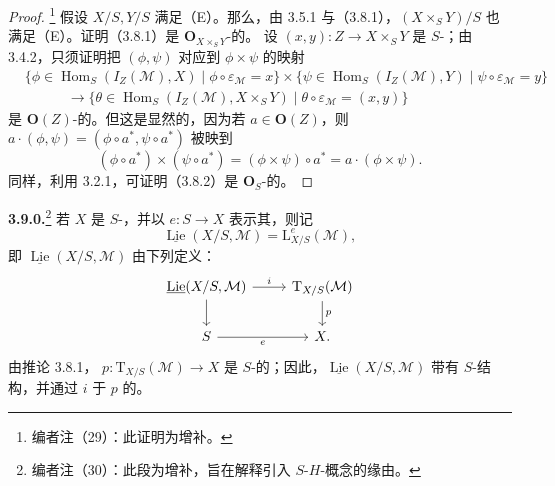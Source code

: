 \begin{proof}
\footnote{编者注（29）：此证明为增补。} 假设 $X/S,Y/S$ 满足（E）。那么，由 3.5.1 与（3.8.1），$(X\times_S Y)/S$ 也满足（E）。证明（3.8.1）是 $\mathbf O_{X\times_S Y}$-的。
设 $(x,y):Z\to X\times_S Y$ 是 $S$-；由 3.4.2，只须证明把 $(\phi,\psi)$ 对应到 $\phi\times\psi$ 的映射
\[
\begin{aligned}
{}&\{\phi\in\operatorname{Hom}_S(I_Z(\mathcal M),X)\mid\phi\circ\varepsilon_{\mathcal M}=x\}
\times\{\psi\in\operatorname{Hom}_S(I_Z(\mathcal M),Y)\mid\psi\circ\varepsilon_{\mathcal M}=y\}\\
&\hspace{3em}\longrightarrow
\{\theta\in\operatorname{Hom}_S(I_Z(\mathcal M),X\times_S Y)\mid\theta\circ\varepsilon_{\mathcal M}=(x,y)\}
\end{aligned}
\]
是 $\mathbf O(Z)$-的。但这是显然的，因为若 $a\in\mathbf O(Z)$，则 $a\cdot(\phi,\psi)=(\phi\circ a^*,\psi\circ a^*)$ 被映到
\[
(\phi\circ a^*)\times(\psi\circ a^*)=(\phi\times\psi)\circ a^*=a\cdot(\phi\times\psi).
\]
同样，利用 3.2.1，可证明（3.8.2）是 $\mathbf O_S$-的。
\end{proof}
\textbf{3.9.0.}\footnote{编者注（30）：此段为增补，旨在解释引入 $S$-$H$-概念的缘由。} 若 $X$ 是 $S$-，并以 $e:S\to X$ 表示其，则记
\[
\underline{\operatorname{Lie}}(X/S,\mathcal M)=\mathrm L^e_{X/S}(\mathcal M),
\]
即 $\underline{\operatorname{Lie}}(X/S,\mathcal M)$ 由下列定义：
\[
\begin{tikzcd}
\underline{\operatorname{Lie}}(X/S,\mathcal M)\arrow[r,"i"]\arrow[d]&\mathrm T_{X/S}(\mathcal M)\arrow[d,"p"]\\
S\arrow[r,"e"']&X.
\end{tikzcd}
\]
由推论 3.8.1， $p:\mathrm T_{X/S}(\mathcal M)\to X$ 是 $S$-的；因此，$\underline{\operatorname{Lie}}(X/S,\mathcal M)$ 带有 $S$-结构，并通过 $i$ 于 $p$ 的。

